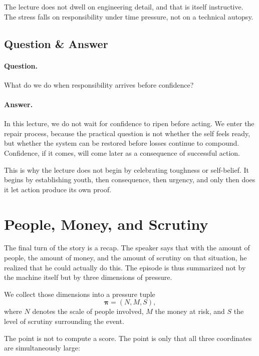 The lecture does not dwell on engineering detail, and that is itself instructive. The stress falls on responsibility under time pressure, not on a technical autopsy.

\subsection{Question \& Answer}

\paragraph{Question.} What do we do when responsibility arrives before confidence?

\paragraph{Answer.} In this lecture, we do not wait for confidence to ripen before acting. We enter the repair process, because the practical question is not whether the self feels ready, but whether the system can be restored before losses continue to compound. Confidence, if it comes, will come later as a consequence of successful action.

This is why the lecture does not begin by celebrating toughness or self-belief. It begins by establishing youth, then consequence, then urgency, and only then does it let action produce its own proof.

\section{People, Money, and Scrutiny}

The final turn of the story is a recap. The speaker says that with the amount of people, the amount of money, and the amount of scrutiny on that situation, he realized that he could actually do this. The episode is thus summarized not by the machine itself but by three dimensions of pressure.

\begin{definition}
We collect those dimensions into a pressure tuple
\begin{equation}
\boldsymbol{\pi}=(N,M,S),
\end{equation}
where \(N\) denotes the scale of people involved, \(M\) the money at risk, and \(S\) the level of scrutiny surrounding the event.
\end{definition}

The point is not to compute a score. The point is only that all three coordinates are simultaneously large:

